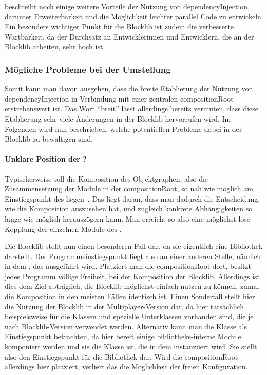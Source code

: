 \textcite[S.~15~ff.]{Seemann2012} beschreibt noch einige weitere Vorteile der Nutzung von \gls{dependencyInjection}, darunter Erweiterbarkeit und die Möglichkeit leichter parallel Code zu entwickeln. Ein besonders wichtiger Punkt für die Blocklib ist zudem die verbesserte Wartbarkeit, da der Durchsatz an Entwicklerinnen und Entwicklern, die an der Blocklib arbeiten, sehr hoch ist.

\subsubsection{Mögliche Probleme bei der Umstellung}

Somit kann man davon ausgehen, dass die breite Etablierung der Nutzung von \gls{dependencyInjection} in Verbindung mit einer zentralen \gls{compositionRoot} erstrebenswert ist. Das Wort \enquote{breit} lässt allerdings bereits vermuten, dass diese Etablierung sehr viele Änderungen in der Blocklib hervorrufen wird. Im Folgenden wird nun beschrieben, welche potentiellen Probleme dabei in der Blocklib zu bewältigen sind.

\paragraph{Unklare Position der ?}
Typischerweise soll die Komposition des Objektgraphen, also die Zusammensetzung der Module in der \gls{compositionRoot}, so nah wie möglich am Einstiegspunkt des  liegen~\cite[S.~232~ff.]{Martin17}\cite[S.~76~f.]{Seemann2012}. Das liegt daran, dass man dadurch die Entscheidung, wie die Komposition auszusehen hat, und zugleich konkrete Abhängigkeiten so lange wie möglich herauszögern kann. Man erreicht so also eine möglichst lose Kopplung der einzelnen Module des .

Die Blocklib stellt nun einen besonderen Fall dar, da sie eigentlich eine Bibliothek darstellt. Der Programmeinstiegspunkt liegt also an einer anderen Stelle, nämlich in dem , das ausgeführt wird. Platziert man die \gls{compositionRoot} dort, besitzt jedes \gls{Programm} völlige Freiheit, bei der Komposition der Blocklib. Allerdings ist dies dem Ziel abträglich, die Blocklib möglichst einfach nutzen zu können, zumal die Komposition in den meisten Fällen identisch ist. Einen Sonderfall stellt hier die Nutzung der Blocklib in der Multiplayer-Version dar, da hier tatsächlich beispielsweise für die Klassen  und  spezielle Unterklassen vorhanden sind, die je nach Blocklib-Version verwendet werden. Alternativ kann man die Klasse  als Einstiegspunkt betrachten, da hier bereit einige bibliotheks-interne Module komponiert werden und sie die Klasse ist, die in dem  instanziiert wird. Sie stellt also den Einstiegspunkt für die Bibliothek dar. Wird die \gls{compositionRoot} allerdings hier platziert, verliert das  die Möglichkeit der freien Konfiguration.


